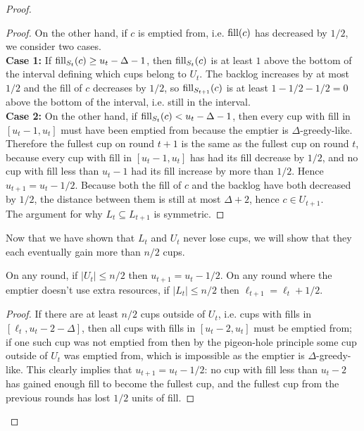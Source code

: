 \begin{proof}
\begin{proof}
    On the other hand, if $c$ is emptied from, i.e. $\operatorname{\textnormal{fill}}(c)$ has decreased by
    $1/2$, we consider two cases.\\
    \textbf{Case 1:} If $\operatorname{\textnormal{fill}}_{S_t}(c) \ge u_t-\Delta -1$, then
    $\operatorname{\textnormal{fill}}_{S_t}(c)$ is at least $1$ above the bottom of the
    interval defining which cups belong to $U_t$. The backlog
    increases by at most $1/2$ and the fill of $c$ decreases by $1/2$, so
    $\operatorname{\textnormal{fill}}_{S_{t+1}}(c)$ is at least $1-1/2-1/2 = 0$ above the bottom of the
    interval, i.e. still in the interval. \\
    \textbf{Case 2:} On the other hand, if $\operatorname{\textnormal{fill}}_{S_t}(c) <
    u_t-\Delta-1$, then every cup with fill in $[u_t-1, u_t]$
    must have been emptied from because the emptier is
    $\Delta$-greedy-like. Therefore the fullest cup
    on round $t+1$ is the same as the fullest cup on round $t$,
    because every cup with fill in $[u_t-1, u_t]$
    has had its fill decrease by $1/2$, and no cup with fill less than
    $u_t-1$ had its fill increase by more than $1/2$. Hence $u_{t+1}
    = u_t -1/2$. Because both the fill of $c$ and the backlog
    have both decreased by $1/2$, the distance between them is
    still at most $\Delta+2$, hence $c\in U_{t+1}$.\\
    The argument for why $L_t \subseteq L_{t+1}$ is symmetric.
  \end{proof}

  Now that we have shown that $L_t$ and $U_t$ never lose cups, we will show
  that they each eventually gain more than $n/2$ cups.

  \begin{clm}
    \label{clm:howDoLandUchange}
    On any round, if $|U_t| \le n/2$ then $u_{t+1} = u_t - 1/2$.
    On any round where the emptier doesn't use extra resources, if
    $|L_t| \le n/2$ then $\ell_{t+1} = \ell_t+ 1/2$.
  \end{clm}
  \begin{proof}
    If there are at least $n/2$ cups outside of $U_t$, i.e. cups
    with fills in $[\ell_t, u_t-2-\Delta]$, then all cups with
    fills in $[u_t - 2, u_t]$ must be emptied from; if one such cup
    was not emptied from then by the pigeon-hole principle some
    cup outside of $U_t$ was emptied from, which is impossible as
    the emptier is $\Delta$-greedy-like.
    This clearly implies that $u_{t+1} = u_t - 1/2$: no cup with fill
    less than $u_t-2$ has gained enough fill to become the fullest
    cup, and the fullest cup from the previous rounds has lost $1/2$
    units of fill.


\end{proof}
\end{proof}
